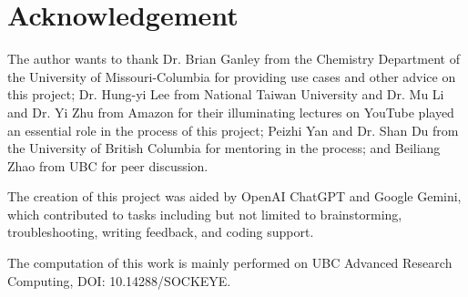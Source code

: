 \documentclass{article}
\begin{document}
\section*{Acknowledgement}
The author wants to thank Dr. Brian Ganley from the Chemistry Department of the University of Missouri-Columbia for providing use cases and other advice on this project; Dr. Hung-yi Lee from National Taiwan University and Dr. Mu Li and Dr. Yi Zhu from Amazon for their illuminating lectures on YouTube played an essential role in the process of this project; Peizhi Yan and Dr. Shan Du from the University of British Columbia for mentoring in the process; and Beiliang Zhao from UBC for peer discussion.

The creation of this project was aided by OpenAI ChatGPT and Google Gemini, which contributed to tasks including but not limited to brainstorming, troubleshooting, writing feedback, and coding support.

The computation of this work is mainly performed on UBC Advanced Research Computing, DOI: 10.14288/SOCKEYE.

\printbibliography
\end{document}
